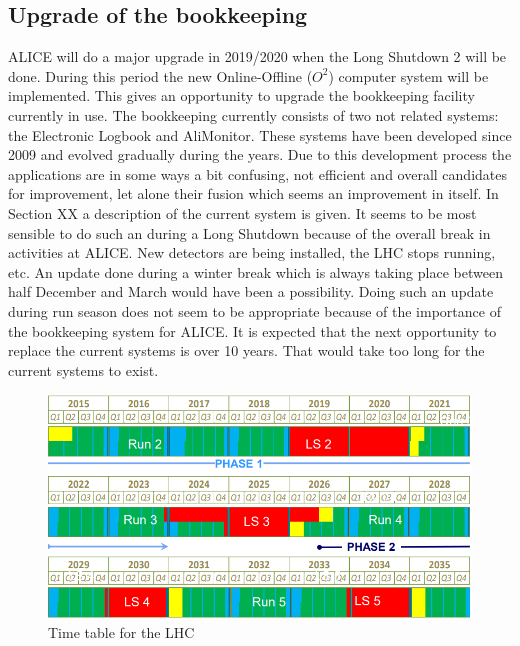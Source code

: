 \subsection{Upgrade of the bookkeeping}
ALICE will do a major upgrade in 2019/2020 when the Long Shutdown 2 will be done. During this period the new Online-Offline ($O^2$) computer system will be implemented. This gives an opportunity to upgrade the bookkeeping facility currently in use. The bookkeeping currently consists of two not related systems: the Electronic Logbook and AliMonitor. These systems have been developed since 2009 and evolved gradually during the years. Due to this development process the applications are in some ways a bit confusing, not efficient and overall candidates for improvement, let alone their fusion which seems an improvement in itself. In Section XX a description of the current system is given. It seems to be most sensible to do such an during a Long Shutdown because of the overall break in activities at ALICE. New detectors are being installed, the LHC stops running, etc. An update done during a winter break which is always taking place between half December and March would have been a possibility. Doing such an update during run season does not seem to be appropriate because of the importance of the bookkeeping system for ALICE. It is expected that the next opportunity to replace the current systems is over 10 years. That would take too long for the current systems to exist.

\begin{figure}[h]
  \begin{center}
    \includegraphics[scale=0.3]{./timetable.png}
    \caption{Time table for the LHC}
    \label{fig:timetable}
  \end{center}
\end{figure}

